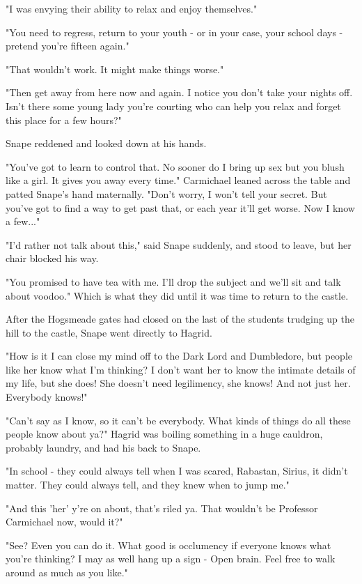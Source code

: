 \documentclass[a4paper,11pt]{article}
\begin{document}
"I was envying their ability to relax and enjoy themselves."

"You need to regress, return to your youth - or in your case, your school days - pretend you're fifteen again."

"That wouldn't work. It might make things worse."

"Then get away from here now and again. I notice you don't take your nights off. Isn't there some young lady you're courting who can help you relax and forget this place for a few hours?"

Snape reddened and looked down at his hands.

"You've got to learn to control that. No sooner do I bring up sex but you blush like a girl. It gives you away every time." Carmichael leaned across the table and patted Snape's hand maternally. "Don't worry, I won't tell your secret. But you've got to find a way to get past that, or each year it'll get worse. Now I know a few..."

"I'd rather not talk about this," said Snape suddenly, and stood to leave, but her chair blocked his way.

"You promised to have tea with me. I'll drop the subject and we'll sit and talk about voodoo." Which is what they did until it was time to return to the castle.

After the Hogsmeade gates had closed on the last of the students trudging up the hill to the castle, Snape went directly to Hagrid.

"How is it I can close my mind off to the Dark Lord and Dumbledore, but people like her know what I'm thinking? I don't want her to know the intimate details of my life, but she does! She doesn't need legilimency, she knows! And not just her. Everybody knows!"

"Can't say as I know, so it can't be everybody. What kinds of things do all these people know about ya?" Hagrid was boiling something in a huge cauldron, probably laundry, and had his back to Snape.

"In school - they could always tell when I was scared, Rabastan, Sirius, it didn't matter. They could always tell, and they knew when to jump me."

"And this 'her' y're on about, that's riled ya. That wouldn't be Professor Carmichael now, would it?"

"See? Even you can do it. What good is occlumency if everyone knows what you're thinking? I may as well hang up a sign - Open brain. Feel free to walk around as much as you like."
\end{document}
